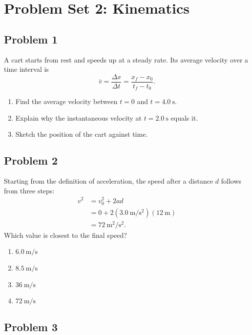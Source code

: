 \documentclass[11pt]{article}
\begin{document}
\section*{Problem Set 2: Kinematics}

\subsection*{Problem 1}

A cart starts from rest and speeds up at a steady rate. Its average velocity over a
time interval is
\begin{equation}
  \bar{v} = \frac{\Delta x}{\Delta t} = \frac{x_f - x_0}{t_f - t_0}.
  \label{eq:average}
\end{equation}
\begin{enumerate}
  \renewcommand{\labelenumi}{(\alph{enumi})}
  \item Find the average velocity between $t = 0$ and $t = 4.0\ \mathrm{s}$.
  \item Explain why the instantaneous velocity at $t = 2.0\ \mathrm{s}$ equals it.
  \item Sketch the position of the cart against time.
\end{enumerate}

\subsection*{Problem 2}

Starting from the definition of acceleration, the speed after a distance $d$ follows
from three steps:
\begin{align*}
  v^2 &= v_0^2 + 2 a d \\
      &= 0 + 2 \left(3.0\ \mathrm{m/s^2}\right)\left(12\ \mathrm{m}\right) \\
      &= 72\ \mathrm{m^2/s^2}.
\end{align*}
Which value is closest to the final speed?
\begin{enumerate}
  \renewcommand{\labelenumi}{\Alph{enumi}.}
  \item $6.0\ \mathrm{m/s}$
  \item $8.5\ \mathrm{m/s}$
  \item $36\ \mathrm{m/s}$
  \item $72\ \mathrm{m/s}$
\end{enumerate}

\subsection*{Problem 3}
\end{document}

